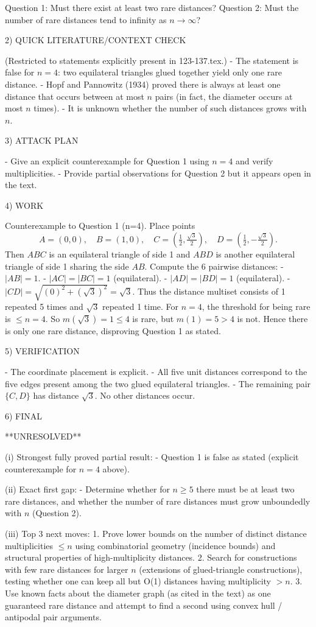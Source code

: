 Question 1: Must there exist at least two rare distances?
Question 2: Must the number of rare distances tend to infinity as $n\to\infty$?

2) QUICK LITERATURE/CONTEXT CHECK

(Restricted to statements explicitly present in 123-137.tex.)
- The statement is false for $n=4$: two equilateral triangles glued together yield only one rare distance.
- Hopf and Pannowitz (1934) proved there is always at least one distance that occurs between at most $n$ pairs (in fact, the diameter occurs at most $n$ times).
- It is unknown whether the number of such distances grows with $n$.

3) ATTACK PLAN

- Give an explicit counterexample for Question 1 using $n=4$ and verify multiplicities.
- Provide partial observations for Question 2 but it appears open in the text.

4) WORK

Counterexample to Question 1 (n=4).
Place points
\[
A=(0,0),\quad B=(1,0),\quad C=\left(\tfrac12,\tfrac{\sqrt3}{2}\right),\quad D=\left(\tfrac12,-\tfrac{\sqrt3}{2}\right).
\]
Then $ABC$ is an equilateral triangle of side 1 and $ABD$ is another equilateral triangle of side 1 sharing the side $AB$.
Compute the 6 pairwise distances:
- $|AB|=1$.
- $|AC|=|BC|=1$ (equilateral).
- $|AD|=|BD|=1$ (equilateral).
- $|CD|=\sqrt{ (0)^2 + (\sqrt3)^2 }=\sqrt3$.
Thus the distance multiset consists of 1 repeated 5 times and $\sqrt3$ repeated 1 time.
For $n=4$, the threshold for being rare is $\le n=4$.
So $m(\sqrt3)=1\le 4$ is rare, but $m(1)=5>4$ is not.
Hence there is only one rare distance, disproving Question 1 as stated.

5) VERIFICATION

- The coordinate placement is explicit.
- All five unit distances correspond to the five edges present among the two glued equilateral triangles.
- The remaining pair $\{C,D\}$ has distance $\sqrt3$.
No other distances occur.

6) FINAL

**UNRESOLVED**

(i) Strongest fully proved partial result:
- Question 1 is false as stated (explicit counterexample for $n=4$ above).

(ii) Exact first gap:
- Determine whether for $n\ge 5$ there must be at least two rare distances, and whether the number of rare distances must grow unboundedly with $n$ (Question 2).

(iii) Top 3 next moves:
1. Prove lower bounds on the number of distinct distance multiplicities $\le n$ using combinatorial geometry (incidence bounds) and structural properties of high-multiplicity distances.
2. Search for constructions with few rare distances for larger $n$ (extensions of glued-triangle constructions), testing whether one can keep all but O(1) distances having multiplicity $>n$.
3. Use known facts about the diameter graph (as cited in the text) as one guaranteed rare distance and attempt to find a second using convex hull / antipodal pair arguments.

